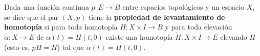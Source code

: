 \documentclass[GTSResumen.tex]{subfiles}
\begin{document}

\begin{defi}
Dada una función continua $p:E\to B$ entre espacios topológicos y un espacio $X$, se dice que el par $(X,p)$ tiene la \textbf{propiedad de levantamiento de homotopía} si para toda homotopía $H:X\times I\to B$ y para toda elevación $\tilde{\alpha}:X\to E$ de $\alpha(t)=H(t,0)$ existe una homotopía $\widetilde{H}:X\times I\to E$ elevando $H$ (esto es, $p\widetilde{H}=H$) tal que $\tilde{\alpha}(t)=\widetilde{H}(t,0)$. 
\end{defi}

\end{document}
